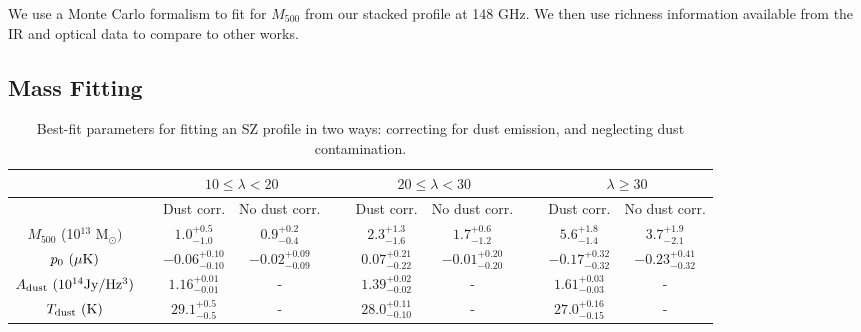 \documentclass[a4paper,fleqn,usenatbib]{mnras}
\begin{document}
We use a Monte Carlo formalism to fit for $M_{500}$ from our stacked profile at 148 GHz. We then use richness information available from the IR and optical data to compare to other works.




\subsection{Mass Fitting}

\begin{table}
   
  \centering
  \caption{Best-fit parameters for fitting an SZ profile in two ways: correcting for dust emission, and neglecting dust contamination.}
  \begin{threeparttable}
  \begin{tabular}{|*{10}{c|}}
    \hline
    & & \multicolumn{2}{|c}{$10 \leq \lambda < 20$} & & \multicolumn{2}{|c|}{$20 \leq \lambda < 30$} & & \multicolumn{2}{|c|}{$\lambda \geq 30$}\\ \hline
    
    & & Dust corr. & No dust corr. & \ &  Dust corr. & No dust corr. & \ &  Dust corr. & No dust corr. \\ \hline
    
    $M_{500}$ (10$^{13}$ M$_{\odot})$ & & $1.0^{+0.5}_{-1.0}$ & $0.9^{+0.2}_{-0.4}$ & \ & $2.3^{+1.3}_{-1.6}$ & $1.7^{+0.6}_{-1.2}$ & \ & $5.6^{+1.8}_{-1.4}$ & $3.7^{+1.9}_{-2.1}$ \\ \hline
     
    $p_0 \ (\rm \mu K)$ & & $-0.06^{+0.10}_{-0.10}$ & $-0.02^{+0.09}_{-0.09}$ & \ & $0.07^{+0.21}_{-0.22}$ & $-0.01^{+0.20}_{-0.20}$ & \ & $-0.17^{+0.32}_{-0.32}$ & $-0.23^{+0.41}_{-0.32}$ \\ \hline
    
    $A_{\rm dust} \ (\rm 10^{14} Jy/Hz^3)$ & & $1.16^{+0.01}_{-0.01}$ & - & \ & $1.39^{+0.02}_{-0.02}$ & - & \ & $1.61^{+0.03}_{-0.03}$ & - \\ \hline
    
    $T_{\rm dust} \ (\rm K)$ & & $29.1^{+0.5}_{-0.5}$  & - & \ & $28.0^{+0.11}_{-0.10}$ & - & \ & $27.0^{+0.16}_{-0.15}$ & - \\ \hline %
    
    

\end{tabular}
\end{threeparttable}
\end{table}
\end{document}
